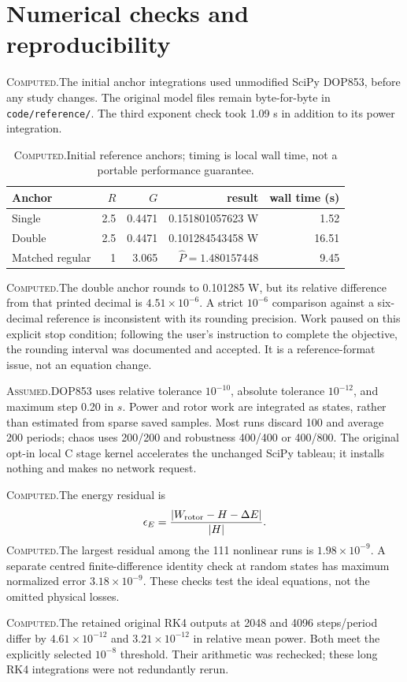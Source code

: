 \documentclass[10pt,a4paper]{article}
\newcommand{\C}{\textcolor{accent}{\textsc{Computed.}}\enspace}
\newcommand{\A}{\textcolor{accent}{\textsc{Assumed.}}\enspace}
\newcommand{\page}[1]{\clearpage\section{#1}}
\begin{document}
\page{Numerical checks and reproducibility}
\C The initial anchor integrations used unmodified SciPy DOP853, before any study changes. The original model files remain byte-for-byte in \texttt{code/reference/}. The third exponent check took 1.09 s in addition to its power integration.
\begin{table}[H]\centering\small
\caption{\C Initial reference anchors; timing is local wall time, not a portable performance guarantee.}
\begin{tabular}{lrrrr}\toprule
Anchor&$R$&$G$&result&wall time (s)\\\midrule
Single&2.5&0.4471&0.151801057623 W&1.52\\
Double&2.5&0.4471&0.101284543458 W&16.51\\
Matched regular&1&3.065&$\widehat P=1.480157448$&9.45\\\bottomrule
\end{tabular}\end{table}
\C The double anchor rounds to 0.101285 W, but its relative difference from that printed decimal is $4.51\times10^{-6}$. A strict $10^{-6}$ comparison against a six-decimal reference is inconsistent with its rounding precision. Work paused on this explicit stop condition; following the user's instruction to complete the objective, the rounding interval was documented and accepted. It is a reference-format issue, not an equation change.

\A DOP853 uses relative tolerance $10^{-10}$, absolute tolerance $10^{-12}$, and maximum step 0.20 in $s$. Power and rotor work are integrated as states, rather than estimated from sparse saved samples. Most runs discard 100 and average 200 periods; chaos uses 200/200 and robustness 400/400 or 400/800. The original opt-in local C stage kernel accelerates the unchanged SciPy tableau; it installs nothing and makes no network request.

\C The energy residual is
\begin{equation}
\epsilon_E=\frac{|W_{\rm rotor}-H-\Delta E|}{|H|}.
\end{equation}
\C The largest residual among the 111 nonlinear runs is $\ensuremath{1.98\times10^{-9}}$. A separate centred finite-difference identity check at random states has maximum normalized error $\ensuremath{3.18\times10^{-9}}$. These checks test the ideal equations, not the omitted physical losses.

\C The retained original RK4 outputs at 2048 and 4096 steps/period differ by $\ensuremath{4.61\times10^{-12}}$ and $\ensuremath{3.21\times10^{-12}}$ in relative mean power. Both meet the explicitly selected $10^{-8}$ threshold. Their arithmetic was rechecked; these long RK4 integrations were not redundantly rerun.
\end{document}
